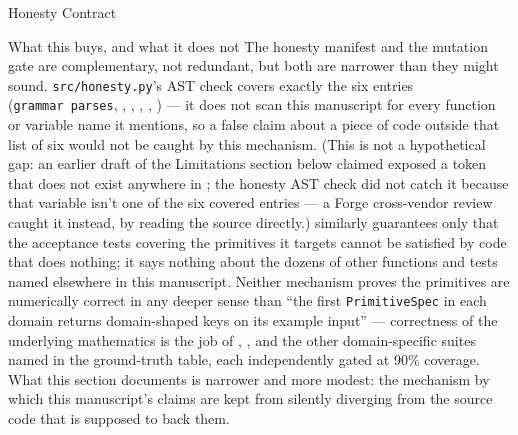 \documentclass[
  ignorenonframetext,
]{beamer}
\begin{document}
\begin{frame}{Honesty Contract}
\begin{block}{What this buys, and what it does not}
\protect{}\label{what-this-buys-and-what-it-does-not}
The honesty manifest and the mutation gate are complementary, not
redundant, but both are narrower than they might sound.
\texttt{src/honesty.py}'s AST check covers exactly the six
 entries (\texttt{grammar\ parses},
, ,
, ,
) --- it does not scan this manuscript for
every function or variable name it mentions, so a false claim about a
piece of code outside that list of six would not be caught by this
mechanism. (This is not a hypothetical gap: an earlier draft of the
Limitations section below claimed  exposed a
 token that does not exist anywhere in
; the honesty AST check did not
catch it because that variable isn't one of the six covered entries ---
a Forge cross-vendor review caught it instead, by reading the source
directly.)  similarly guarantees only that
the acceptance tests covering the primitives it targets cannot be
satisfied by code that does nothing; it says nothing about the dozens of
other functions and tests named elsewhere in this manuscript. Neither
mechanism proves the primitives are numerically correct in any deeper
sense than ``the first \texttt{PrimitiveSpec} in each domain returns
domain-shaped keys on its example input'' --- correctness of the
underlying mathematics is the job of
,
, and the other domain-specific
suites named in the ground-truth table, each independently gated at 90\%
coverage. What this section documents is narrower and more modest: the
mechanism by which this manuscript's claims are kept from silently
diverging from the source code that is supposed to back them.
\end{block}
\end{frame}
\end{document}
